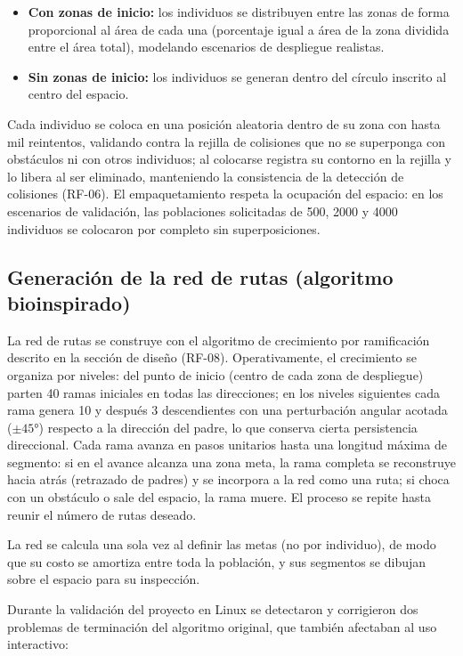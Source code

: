 \documentclass[12pt,a4paper]{article}
\begin{document}
\begin{itemize}
    \item \textbf{Con zonas de inicio:} los individuos se distribuyen entre las zonas de forma proporcional al área de cada una (porcentaje igual a área de la zona dividida entre el área total), modelando escenarios de despliegue realistas.
    \item \textbf{Sin zonas de inicio:} los individuos se generan dentro del círculo inscrito al centro del espacio.
\end{itemize}

Cada individuo se coloca en una posición aleatoria dentro de su zona con hasta mil reintentos, validando contra la rejilla de colisiones que no se superponga con obstáculos ni con otros individuos; al colocarse registra su contorno en la rejilla y lo libera al ser eliminado, manteniendo la consistencia de la detección de colisiones (RF-06). El empaquetamiento respeta la ocupación del espacio: en los escenarios de validación, las poblaciones solicitadas de 500, 2000 y 4000 individuos se colocaron por completo sin superposiciones.

\subsection{Generación de la red de rutas (algoritmo bioinspirado)}

La red de rutas se construye con el algoritmo de crecimiento por ramificación descrito en la sección de diseño (RF-08). Operativamente, el crecimiento se organiza por niveles: del punto de inicio (centro de cada zona de despliegue) parten 40 ramas iniciales en todas las direcciones; en los niveles siguientes cada rama genera 10 y después 3 descendientes con una perturbación angular acotada ($\pm 45°$) respecto a la dirección del padre, lo que conserva cierta persistencia direccional. Cada rama avanza en pasos unitarios hasta una longitud máxima de segmento: si en el avance alcanza una zona meta, la rama completa se reconstruye hacia atrás (retrazado de padres) y se incorpora a la red como una ruta; si choca con un obstáculo o sale del espacio, la rama muere. El proceso se repite hasta reunir el número de rutas deseado.

La red se calcula una sola vez al definir las metas (no por individuo), de modo que su costo se amortiza entre toda la población, y sus segmentos se dibujan sobre el espacio para su inspección.

Durante la validación del proyecto en Linux se detectaron y corrigieron dos problemas de terminación del algoritmo original, que también afectaban al uso interactivo:
\end{document}
